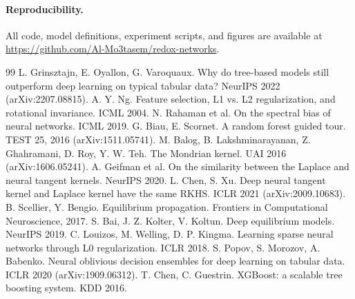 \documentclass[11pt]{article}
\begin{document}
\paragraph{Reproducibility.} All code, model definitions, experiment scripts, and figures are
available at \url{https://github.com/Al-Mo3tasem/redox-networks}.

\begin{thebibliography}{99}
 L. Grinsztajn, E. Oyallon, G. Varoquaux. Why do tree-based models still outperform deep learning on typical tabular data? NeurIPS 2022 (arXiv:2207.08815).
 A. Y. Ng. Feature selection, L1 vs. L2 regularization, and rotational invariance. ICML 2004.
 N. Rahaman et al. On the spectral bias of neural networks. ICML 2019.
 G. Biau, E. Scornet. A random forest guided tour. TEST 25, 2016 (arXiv:1511.05741).
 M. Balog, B. Lakshminarayanan, Z. Ghahramani, D. Roy, Y. W. Teh. The Mondrian kernel. UAI 2016 (arXiv:1606.05241).
 A. Geifman et al. On the similarity between the Laplace and neural tangent kernels. NeurIPS 2020.
 L. Chen, S. Xu. Deep neural tangent kernel and Laplace kernel have the same RKHS. ICLR 2021 (arXiv:2009.10683).
 B. Scellier, Y. Bengio. Equilibrium propagation. Frontiers in Computational Neuroscience, 2017.
 S. Bai, J. Z. Kolter, V. Koltun. Deep equilibrium models. NeurIPS 2019.
 C. Louizos, M. Welling, D. P. Kingma. Learning sparse neural networks through L0 regularization. ICLR 2018.
 S. Popov, S. Morozov, A. Babenko. Neural oblivious decision ensembles for deep learning on tabular data. ICLR 2020 (arXiv:1909.06312).
 T. Chen, C. Guestrin. XGBoost: a scalable tree boosting system. KDD 2016.
\end{thebibliography}
\end{document}
